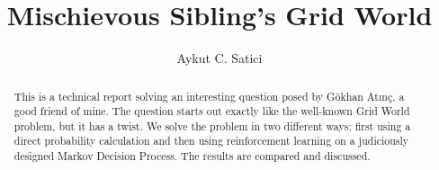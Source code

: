 \begin{frontmatter}



\title{Mischievous Sibling's Grid World}


\author[label1]{Aykut C. Satici}


\begin{abstract}
    This is a technical report solving an interesting question posed by
    G\"{o}khan At{\i}n\c{c}, a good friend of mine. The question starts out
    exactly like the well-known Grid World problem, but it has a twist. We solve
    the problem in two different ways: first using a direct probability
    calculation and then using reinforcement learning on a judiciously designed
    Markov Decision Process. The results are compared and discussed.
\end{abstract}


\end{frontmatter}
